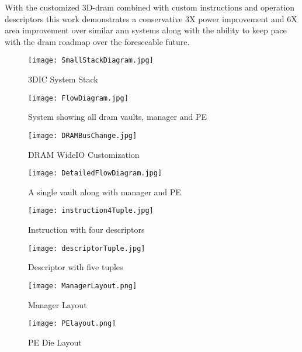 \documentclass[journal]{IEEEtran}
\begin{document}
With the customized 3D-\ac{dram} combined with custom instructions and operation descriptors this work demonstrates a conservative 3X power improvement and 6X area improvement over similar \ac{ann} systems along with the ability to keep pace with the \ac{dram} roadmap over the foreseeable future.

\newpage
\begin{figure}[h]
    \centering
    \begin{minipage}{0.3\textwidth}
        \centering
        \texttt{[image: SmallStackDiagram.jpg]} 
        \caption{3DIC System Stack}
        \label{fig:3DICStack}
    \end{minipage}
    \hfill
    \begin{minipage}{0.3\textwidth}
        \centering
        \texttt{[image: FlowDiagram.jpg]} 
        \caption{System showing all \ac{dram} vaults, manager and PE}
        \label{fig:FlowDiagram}
    \end{minipage}
    \hfill
    \begin{minipage}{0.3\textwidth}
        \centering
        \texttt{[image: DRAMBusChange.jpg]} 
        \caption{DRAM WideIO Customization}
        \label{fig:customDram}
    \end{minipage}
\end{figure}
\begin{figure}[h]
    \centering
    \begin{minipage}{0.3\textwidth}
        \centering
        \texttt{[image: DetailedFlowDiagram.jpg]} 
        \caption{A single vault along with manager and PE}
        \label{fig:SSC}
    \end{minipage}
    \hfill
    \begin{minipage}{0.3\textwidth}
        \centering
        \texttt{[image: instruction4Tuple.jpg]} 
        \caption{Instruction with four descriptors}
        \label{fig:instruction}
    \end{minipage}
    \hfill
    \begin{minipage}{0.3\textwidth}
        \centering
        \texttt{[image: descriptorTuple.jpg]} 
        \caption{Descriptor with five tuples}
        \label{fig:descriptor}
    \end{minipage}
\end{figure}
\begin{figure}[h]
    \centering
    \begin{minipage}{0.3\textwidth}
        \centering
        \texttt{[image: ManagerLayout.png]} 
        \caption{Manager Layout}
        \label{fig:managerLayout}
    \end{minipage}
    \hfill
    \begin{minipage}{0.3\textwidth}
        \centering
        \texttt{[image: PElayout.png]} 
        \caption{PE Die Layout}
        \label{fig:peLayout}
    \end{minipage}
\end{figure}




\end{document}
